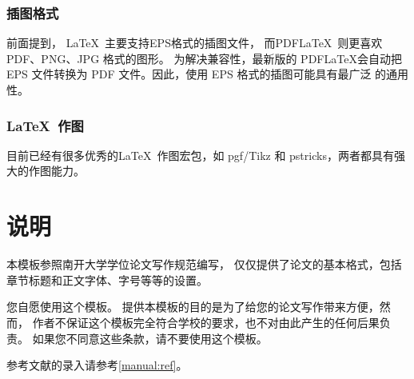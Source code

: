 \subsection{插图格式}

前面提到， \LaTeX\ 主要支持EPS格式的插图文件， 而PDF\LaTeX\ 则更喜欢 PDF、PNG、JPG 格式的图形。
为解决兼容性，最新版的 PDF\LaTeX 会自动把 EPS 文件转换为 PDF 文件。因此，使用 EPS 格式的插图可能具有最广泛
的通用性。

\subsection{\LaTeX\ 作图}

目前已经有很多优秀的\LaTeX\ 作图宏包，如 pgf/Tikz 和 pstricks，两者都具有强大的作图能力。

\chapter{说明}



本模板参照南开大学学位论文写作规范编写，
仅仅提供了论文的基本格式，包括章节标题和正文字体、字号等等的设置。



您自愿使用这个模板。
提供本模板的目的是为了给您的论文写作带来方便，然而，
作者不保证这个模板完全符合学校的要求，也不对由此产生的任何后果负责。
如果您不同意这些条款，请不要使用这个模板。


参考文献的录入请参考\ref{manual:ref}。 